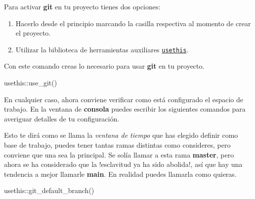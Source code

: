 \documentclass[
  spanish,
  letterpaper,
  DIV=11,
  numbers=noendperiod]{scrartcl}
\newenvironment{Shaded}{\begin{snugshade}}{\end{snugshade}}
\newcommand{\FunctionTok}[1]{\textcolor[rgb]{0.28,0.35,0.67}{#1}}
\newcommand{\NormalTok}[1]{\textcolor[rgb]{0.00,0.23,0.31}{#1}}
\newcommand{\SpecialCharTok}[1]{\textcolor[rgb]{0.37,0.37,0.37}{#1}}
\providecommand{\tightlist}{%
  \setlength{\itemsep}{0pt}\setlength{\parskip}{0pt}}
\begin{document}
\begin{tcolorbox}[enhanced jigsaw, rightrule=.15mm, toprule=.15mm, coltitle=black, opacitybacktitle=0.6, colframe=quarto-callout-note-color-frame, leftrule=.75mm, title=\textcolor{quarto-callout-note-color}{\faInfo}\hspace{0.5em}{Activar git}, bottomtitle=1mm, toptitle=1mm, colbacktitle=quarto-callout-note-color!10!white, colback=white, breakable, opacityback=0, left=2mm, arc=.35mm, bottomrule=.15mm, titlerule=0mm]

Para activar \textbf{git} en tu proyecto tienes dos opciones:

\begin{enumerate}
\def\labelenumi{\arabic{enumi}.}
\tightlist
\item
  Hacerlo desde el principio marcando la casilla respectiva al momento
  de crear el proyecto.
\item
  Utilizar la biblioteca de herramientas auxiliares
  \href{https://usethis.r-lib.org/articles/git-credentials.html}{\texttt{usethis}}.
\end{enumerate}

Con este comando creas lo necesario para usar \textbf{git} en tu
proyecto.

\begin{Shaded}
\begin{Highlighting}[]
\NormalTok{usethis}\SpecialCharTok{::}\FunctionTok{use\_git}\NormalTok{()}
\end{Highlighting}
\end{Shaded}

En cualquier caso, ahora conviene verificar como está configurado el
espacio de trabajo. En la ventana de \textbf{consola} puedes escribir
los siguientes comandos para averiguar detalles de tu configuración.

Esto te dirá como se llama la \emph{ventana de tiempo} que has elegido
definir como base de trabajo, puedes tener tantas ramas distintas como
consideres, pero conviene que una sea la principal. Se solía llamar a
esta rama \textbf{master}, pero ahora se ha considerado que la
!esclavitud ya ha sido abolida!, así que hay una tendencia a mejor
llamarle \textbf{main}. En realidad puedes llamarla como quieras.

\begin{Shaded}
\begin{Highlighting}[]
\NormalTok{usethis}\SpecialCharTok{::}\FunctionTok{git\_default\_branch}\NormalTok{()}
\end{Highlighting}
\end{Shaded}


\end{tcolorbox}
\end{document}
